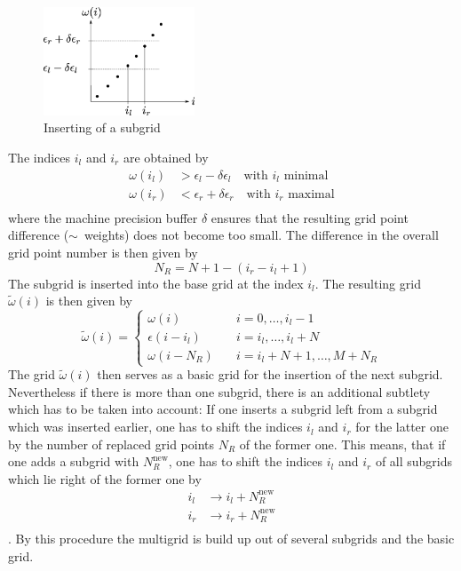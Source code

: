 \begin{figure}[h]
	\centering
	\includegraphics[width=0.4\textwidth]{pics/subgrid_inserting.eps}
	\caption{Inserting of a subgrid}
	\label{fig:subgrid_inserting}
\end{figure}
The indices $i_l$ and $i_r$ are obtained by
\begin{align*}
	\omega(i_l) & > \epsilon_l - \delta \epsilon_l \quad \text{with } i_l \text{ minimal} \\
	\omega(i_r) & < \epsilon_r + \delta \epsilon_r \quad \text{with } i_r \text{ maximal} \\
\end{align*}
where the machine precision buffer $\delta$ ensures that the resulting grid point difference ($\sim$~weights) does not become too small. 
The difference in the overall grid point number is then given by
\[
	N_R=N +1 - (i_r-i_l+1)
\]
The subgrid is inserted into the base grid at the index $i_l$. The resulting grid $\tilde \omega(i)$ is then given by
\[
	\tilde \omega(i)=\begin{cases}
			\omega(i) \quad & i = 0,\dots,i_l-1 \\
			\epsilon(i-i_l) \quad & i=i_l,\dots,i_l+N\\
			\omega(i-N_R) \quad & i=i_l+N+1,\dots,M+N_R
 	          \end{cases}
\]
The grid $\tilde \omega(i)$ then serves as a basic grid for the insertion of the next subgrid. Nevertheless if there is more than one subgrid, there is an additional subtlety which has to be taken into account: If one inserts a subgrid left from a subgrid which was inserted earlier, one has to shift the indices $i_l$ and $i_r$ for the latter one by the number of replaced grid points $N_R$ of the former one. This means, that if one adds a subgrid with $N_R^\text{new}$, one has to shift the indices $i_l$ and $i_r$ of all subgrids which lie right of the former one by
\begin{align*}
	i_l &\to i_l + N_R^\text{new} \\
	i_r &\to i_r + N_R^\text{new} \\
\end{align*}.
By this procedure the multigrid is build up out of several subgrids and the basic grid.

